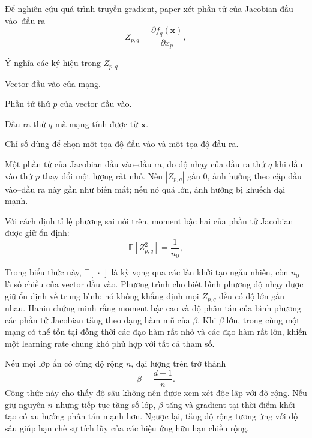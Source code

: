 \documentclass[12pt]{article}
\begin{document}
Để nghiên cứu quá trình truyền gradient, paper xét phần tử của Jacobian đầu
vào--đầu ra
\[
    Z_{p,q}=\frac{\partial f_q(\mathbf{x})}{\partial x_p},
\]

\begin{infobox}{Ý nghĩa các ký hiệu trong $Z_{p,q}$}
\small
\begin{description}[
    style=multiline,
    leftmargin=3.8em,
    labelwidth=3em,
    labelsep=0.8em,
    itemsep=3pt,
    topsep=2pt
]
    \item[$\mathbf{x}$] Vector đầu vào của mạng.

    \item[$x_p$] Phần tử thứ $p$ của vector đầu vào.

    \item[$f_q(\mathbf{x})$] Đầu ra thứ $q$ mà mạng tính được từ
    $\mathbf{x}$.

    \item[$p,q$] Chỉ số dùng để chọn một tọa độ đầu vào và một tọa độ đầu ra.

    \item[$Z_{p,q}$] Một phần tử của Jacobian đầu vào--đầu ra, đo độ nhạy của
    đầu ra thứ $q$ khi đầu vào thứ $p$ thay đổi một lượng rất nhỏ. Nếu
    $|Z_{p,q}|$ gần $0$, ảnh hưởng theo cặp đầu vào--đầu ra này gần như biến
    mất; nếu nó quá lớn, ảnh hưởng bị khuếch đại mạnh.
\end{description}
\end{infobox}

Với cách định tỉ lệ phương sai nói trên, moment bậc hai của phần tử Jacobian
được giữ ổn định:
\[
    \mathbb{E}\!\left[Z_{p,q}^{2}\right]=\frac{1}{n_0},
\]

Trong biểu thức này, $\mathbb{E}[\,\cdot\,]$ là kỳ vọng qua các lần khởi tạo
ngẫu nhiên, còn $n_0$ là số chiều của vector đầu vào. Phương trình cho biết
bình phương độ nhạy được giữ ổn định về trung bình; nó không khẳng định mọi
$Z_{p,q}$ đều có độ lớn gần nhau. Hanin chứng minh
rằng moment bậc cao và độ phân tán của bình phương các phần tử Jacobian tăng
theo dạng hàm mũ của $\beta$. Khi $\beta$ lớn, trong cùng một mạng có thể tồn
tại đồng thời các đạo hàm rất nhỏ và các đạo hàm rất lớn, khiến một learning
rate chung khó phù hợp với tất cả tham số.

Nếu mọi lớp ẩn có cùng độ rộng $n$, đại lượng trên trở thành
\[
    \beta=\frac{d-1}{n}.
\]
Công thức này cho thấy độ sâu không nên được xem xét độc lập với độ rộng. Nếu
giữ nguyên $n$ nhưng tiếp tục tăng số lớp, $\beta$ tăng và gradient tại thời
điểm khởi tạo có xu hướng phân tán mạnh hơn. Ngược lại, tăng độ rộng tương ứng
với độ sâu giúp hạn chế sự tích lũy của các hiệu ứng hữu hạn chiều rộng.
\end{document}
